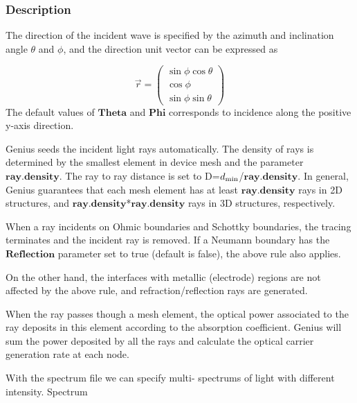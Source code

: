 \documentclass[oneside,12pt]{cgd_book}
\begin{document}
\subsubsection{Description}
The direction of the incident wave is specified by the azimuth and inclination angle
$\theta$ and $\phi$, and the direction unit vector can be
          expressed as
\par
\begin{equation}
\vec{r}=\left(\begin{array}{c}
\sin\phi\cos\theta\\
\cos\phi\\
\sin\phi\sin\theta
\end{array}\right)
\end{equation}
The default values of $\mathbf{Theta}$ and $\mathbf{Phi}$ corresponds to
          incidence along the positive y-axis direction.
\par
{}Genius seeds the incident light rays automatically. The density of rays is determined by the smallest
            element in device mesh and the parameter $\mathbf{ray.density}$. The ray to ray distance is set
            to D=$d_{\rm min}$/$\mathbf{ray.density}$. In general, Genius
            guarantees that each mesh element has at least $\mathbf{ray.density}$
rays in 2D structures, and $\mathbf{ray.density}$*$\mathbf{ray.density}$
rays in 3D structures,
            respectively.
\par
\par
{}When a ray incidents on Ohmic boundaries and Schottky boundaries, the tracing terminates and the
            incident ray is removed. If a Neumann boundary has the
$\mathbf{Reflection}$ parameter set to {\ttsl true} (default is {\ttsl
false}), the above rule also
            applies.
\par
\par
On the other hand, the interfaces with metallic (electrode) regions are not affected by the above rule,
          and refraction/reflection rays are generated.
\par
{}When the ray passes though a mesh element, the optical power associated to the ray deposits in this
            element according to the absorption coefficient. Genius will sum the power deposited by all the rays and
            calculate the optical carrier generation rate at each node.
\par
\par
{}With the spectrum file we can specify multi- spectrums of light with different intensity. Spectrum
\end{document}

